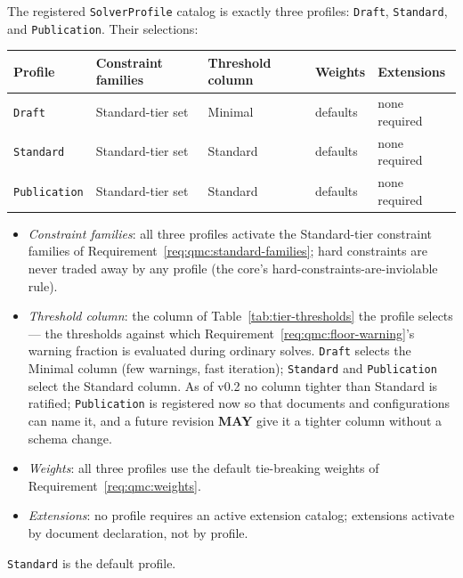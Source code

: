 \documentclass[11pt,letterpaper]{report}
\newcounter{requirement}[chapter]
\newcommand{\MAY}{\textbf{MAY}}
\begin{document}
\begin{requirement}
\label{req:qmc:profiles}
The registered \texttt{SolverProfile} catalog is exactly three profiles:
\texttt{Draft}, \texttt{Standard}, and \texttt{Publication}. Their
selections:

\begin{center}
\small
\begin{tabular}{lllll}
\toprule
\textbf{Profile} & \textbf{Constraint families} & \textbf{Threshold column} &
\textbf{Weights} & \textbf{Extensions} \\
\midrule
\texttt{Draft}       & Standard-tier set & Minimal
  & defaults & none required \\
\texttt{Standard}    & Standard-tier set & Standard
  & defaults & none required \\
\texttt{Publication} & Standard-tier set & Standard
  & defaults & none required \\
\bottomrule
\end{tabular}
\end{center}

\begin{itemize}
  \item \emph{Constraint families}: all three profiles activate the
    Standard-tier constraint families of
    Requirement~\ref{req:qmc:standard-families}; hard constraints are
    never traded away by any profile (the core's
    hard-constraints-are-inviolable rule).
  \item \emph{Threshold column}: the column of
    Table~\ref{tab:tier-thresholds} the profile selects --- the thresholds
    against which Requirement~\ref{req:qmc:floor-warning}'s warning
    fraction is evaluated during ordinary solves. \texttt{Draft} selects
    the Minimal column (few warnings, fast iteration);
    \texttt{Standard} and \texttt{Publication} select the Standard
    column. As of v0.2 no column tighter than Standard is ratified;
    \texttt{Publication} is registered now so that documents and
    configurations can name it, and a future revision \MAY{} give it a
    tighter column without a schema change.
  \item \emph{Weights}: all three profiles use the default tie-breaking
    weights of Requirement~\ref{req:qmc:weights}.
  \item \emph{Extensions}: no profile requires an active extension
    catalog; extensions activate by document declaration, not by
    profile.
\end{itemize}

\texttt{Standard} is the default profile.
\end{requirement}
\end{document}
